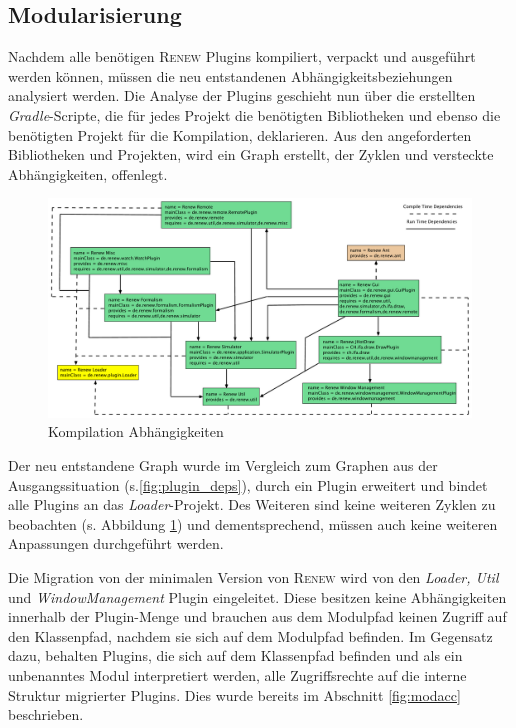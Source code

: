 \subsection{Modularisierung}	
	Nachdem alle benötigen \textsc{Renew} Plugins kompiliert, verpackt und ausgeführt werden können, müssen die neu entstandenen Abhängigkeitsbeziehungen analysiert werden. Die Analyse der Plugins geschieht nun über die erstellten \textit{Gradle}-Scripte, die für jedes Projekt die benötigten Bibliotheken und ebenso die benötigten Projekt für die Kompilation, deklarieren. Aus den angeforderten Bibliotheken und Projekten, wird ein Graph erstellt, der Zyklen und versteckte Abhängigkeiten, offenlegt. \bigbreak

	\begin{figure}[h!]
	  \centering
	  \includegraphics[scale=0.45, angle=90]{material/images/renew_plugin_dependencies-module-info.pdf}
	  \caption{Kompilation Abhängigkeiten}
	  \label{fig:mod_deps}
	\end{figure}

	Der neu entstandene Graph wurde im Vergleich zum Graphen aus der Ausgangssituation (s.\ref{fig:plugin_deps}), durch ein Plugin erweitert und bindet alle Plugins an das \textit{Loader}-Projekt. Des Weiteren sind keine weiteren Zyklen zu beobachten (s. Abbildung \ref{fig:mod_deps}) und dementsprechend, müssen auch keine weiteren Anpassungen durchgeführt werden. \bigbreak

	Die Migration von der minimalen Version von \textsc{Renew} wird von den \textit{Loader, Util} und \textit{WindowManagement} Plugin eingeleitet. Diese besitzen keine Abhängigkeiten innerhalb der Plugin-Menge und brauchen  aus dem Modulpfad keinen Zugriff auf den Klassenpfad, nachdem sie sich auf dem Modulpfad befinden. Im Gegensatz dazu, behalten Plugins, die sich auf dem Klassenpfad befinden und als ein unbenanntes Modul interpretiert werden, alle Zugriffsrechte auf die interne Struktur migrierter Plugins. Dies wurde bereits im Abschnitt \ref{fig:modacc} beschrieben.\bigbreak

